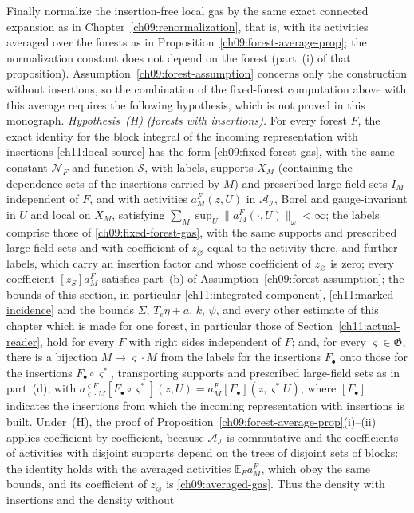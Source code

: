 Finally normalize the insertion-free local gas by the same exact
connected expansion as in Chapter~\ref{ch09:renormalization}, that is, with its activities averaged over the forests as in Proposition~\ref{ch09:forest-average-prop}; the normalization constant does not depend on the forest (part~(i) of that proposition). Assumption~\ref{ch09:forest-assumption} concerns only the construction without insertions, so the combination of the fixed-forest computation above with this average requires the following hypothesis, which is not proved in this monograph. \emph{Hypothesis~(H) (forests with insertions).} For every forest $F$, the exact identity for the block integral of the incoming representation with insertions \eqref{ch11:local-source} has the form \eqref{ch09:fixed-forest-gas}, with the same constant $\mathscr N_F$ and function $\mathscr S$, with labels, supports $X_M$ (containing the dependence sets of the insertions carried by $M$) and prescribed large-field sets $I_M$ independent of $F$, and with activities $a_M^F(z,U)$ in $\mathcal A_{\mathcal I}$, Borel and gauge-invariant in $U$ and local on $X_M$, satisfying $\sum_M\sup_U\|a_M^F(\cdot,U)\|_\omega<\infty$; the labels comprise those of \eqref{ch09:fixed-forest-gas}, with the same supports and prescribed large-field sets and with coefficient of $z_\varnothing$ equal to the activity there, and further labels, which carry an insertion factor and whose coefficient of $z_\varnothing$ is zero; every coefficient $[z_S]a_M^F$ satisfies part~(b) of Assumption~\ref{ch09:forest-assumption}; the bounds of this section, in particular \eqref{ch11:integrated-component}, \eqref{ch11:marked-incidence} and the bounds $\Sigma$, $T_e\eta+a$, $k$, $\psi$, and every other estimate of this chapter which is made for one forest, in particular those of Section~\ref{ch11:actual-reader}, hold for every $F$ with right sides independent of $F$; and, for every $\varsigma\in\mathfrak G$, there is a bijection $M\mapsto\varsigma\cdot M$ from the labels for the insertions $F_\bullet$ onto those for the insertions $F_\bullet\circ\varsigma^*$, transporting supports and prescribed large-field sets as in part~(d), with $a^{\varsigma F}_{\varsigma\cdot M}[F_\bullet\circ\varsigma^*](z,U)=a^F_M[F_\bullet](z,\varsigma^*U)$, where $[F_\bullet]$ indicates the insertions from which the incoming representation with insertions is built. Under~(H), the proof of Proposition~\ref{ch09:forest-average-prop}(i)--(ii) applies coefficient by coefficient, because $\mathcal A_{\mathcal I}$ is commutative and the coefficients of activities with disjoint supports depend on the trees of disjoint sets of blocks: the identity holds with the averaged activities $\mathbb E_Fa_M^F$, which obey the same bounds, and its coefficient of $z_\varnothing$ is \eqref{ch09:averaged-gas}. Thus the density with insertions and the density without 